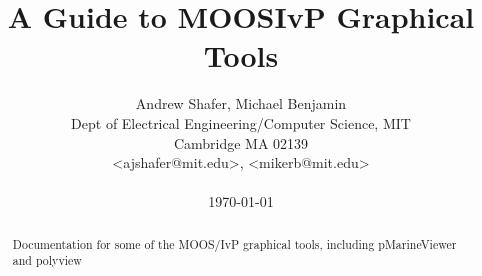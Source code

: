 \documentclass[conference]{IEEEtran}
\newcommand{\email}[1]{\textless #1\textgreater}
\begin{document}
\title{A Guide to MOOSIvP Graphical Tools}
\author{Andrew Shafer, Michael Benjamin \\
Dept of Electrical Engineering/Computer Science, MIT \\
Cambridge MA 02139 \\
\email{ajshafer@mit.edu}, \email{mikerb@mit.edu} \\ \\
{\Large{\today}}}
\maketitle


\begin{abstract}
Documentation for some of the MOOS/IvP graphical tools, including pMarineViewer and polyview
\end{abstract}







\cite{ac90}

\small
 



\newpage
\appendices

%
%
\end{document}

